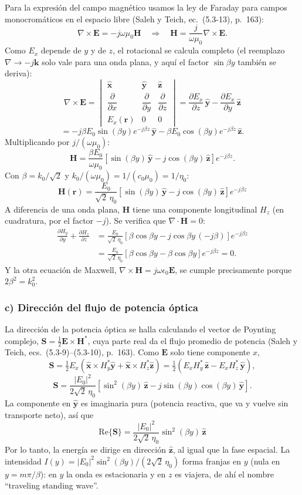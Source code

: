 \documentclass{article}
\newcommand{\xh}{\hat{\mathbf{x}}}
\newcommand{\yh}{\hat{\mathbf{y}}}
\newcommand{\zh}{\hat{\mathbf{z}}}
\begin{document}
Para la expresión del campo magnético usamos la ley de Faraday para campos monocromáticos en el
espacio libre (Saleh y Teich, ec.~(5.3-13), p.~163):
\[
\nabla\times\mathbf E=-j\omega\mu_0\mathbf H
\quad\Rightarrow\quad
\mathbf H=\frac{j}{\omega\mu_0}\nabla\times\mathbf E .
\]
Como $E_x$ depende de $y$ y de $z$, el rotacional se calcula completo (el reemplazo
$\nabla\to-j\mathbf k$ solo vale para una onda plana, y aquí el factor $\sin\beta y$ también se deriva):
\[
\nabla\times\mathbf E=
\begin{vmatrix}
\xh & \yh & \zh\\[2pt]
\dfrac{\partial}{\partial x} & \dfrac{\partial}{\partial y} & \dfrac{\partial}{\partial z}\\[8pt]
E_x(\mathbf r) & 0 & 0
\end{vmatrix}
=\frac{\partial E_x}{\partial z}\,\yh-\frac{\partial E_x}{\partial y}\,\zh
\]
\[
=-j\beta E_0\sin(\beta y)e^{-j\beta z}\,\yh-\beta E_0\cos(\beta y)e^{-j\beta z}\,\zh .
\]
Multiplicando por $j/(\omega\mu_0)$:
\[
\mathbf H=\frac{\beta E_0}{\omega\mu_0}\left[\sin(\beta y)\,\yh-j\cos(\beta y)\,\zh\right]e^{-j\beta z}.
\]
Con $\beta=k_0/\sqrt2$ y $k_0/(\omega\mu_0)=1/(c_0\mu_0)=1/\eta_0$:
\[
\boxed{\;\mathbf H(\mathbf r)=\frac{E_0}{\sqrt2\,\eta_0}\left[\sin(\beta y)\,\yh-j\cos(\beta y)\,\zh\right]e^{-j\beta z}\;}
\]
A diferencia de una onda plana, $\mathbf H$ tiene una componente longitudinal $H_z$ (en cuadratura, por
el factor $-j$). Se verifica que $\nabla\cdot\mathbf H=0$:
\begin{align*}
\frac{\partial H_y}{\partial y}+\frac{\partial H_z}{\partial z}
&=\frac{E_0}{\sqrt2\,\eta_0}\left[\beta\cos\beta y-j\cos\beta y\,(-j\beta)\right]e^{-j\beta z}\\
&=\frac{E_0}{\sqrt2\,\eta_0}\left[\beta\cos\beta y-\beta\cos\beta y\right]e^{-j\beta z}=0 .
\end{align*}
Y la otra ecuación de Maxwell, $\nabla\times\mathbf H=j\omega\epsilon_0\mathbf E$, se cumple
precisamente porque $2\beta^2=k_0^2$.

\subsubsection*{c) Dirección del flujo de potencia óptica}

La dirección de la potencia óptica se halla calculando el vector de Poynting complejo,
$\mathbf S=\tfrac12\mathbf E\times\mathbf H^*$, cuya parte real da el flujo promedio de potencia
(Saleh y Teich, ecs.~(5.3-9)--(5.3-10), p.~163). Como $\mathbf E$ solo tiene componente $x$,
\[
\mathbf S=\tfrac12E_x\left(\xh\times H_y^*\yh+\xh\times H_z^*\zh\right)
=\tfrac12\left(E_xH_y^*\,\zh-E_xH_z^*\,\yh\right),
\]
\[
\mathbf S=\frac{|E_0|^2}{2\sqrt2\,\eta_0}\left[\sin^2(\beta y)\,\zh-j\sin(\beta y)\cos(\beta y)\,\yh\right].
\]
La componente en $\yh$ es imaginaria pura (potencia reactiva, que va y vuelve sin transporte neto), así
que
\[
\boxed{\;\mathrm{Re}\{\mathbf S\}=\frac{|E_0|^2}{2\sqrt2\,\eta_0}\sin^2(\beta y)\,\zh\;}
\]
Por lo tanto, la energía se dirige en dirección $\zh$, al igual que la fase espacial. La intensidad
$I(y)=|E_0|^2\sin^2(\beta y)/(2\sqrt2\,\eta_0)$ forma franjas en $y$ (nula en $y=m\pi/\beta$): en $y$ la onda
es estacionaria y en $z$ es viajera, de ahí el nombre ``traveling standing wave''.
\end{document}
